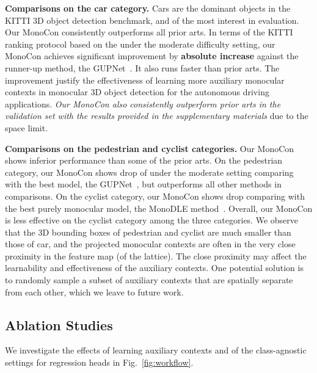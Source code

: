 \documentclass[letterpaper]{article} \usepackage{aaai22}  \usepackage{times}  \usepackage{helvet}  \usepackage{courier}  \usepackage[hyphens]{url}  \usepackage{graphicx} \urlstyle{rm} \def\UrlFont{\rm}  \usepackage{natbib}  \usepackage{caption} \DeclareCaptionStyle{ruled}{labelfont=normalfont,labelsep=colon,strut=off} \frenchspacing  \setlength{\pdfpagewidth}{8.5in}  \setlength{\pdfpageheight}{11in}  \usepackage{algorithm}
\begin{document}
\textbf{Comparisons on the car category.} Cars are the dominant objects in the KITTI 3D object detection benchmark, and of the most interest in evaluation. Our MonoCon consistently outperforms all prior arts. In terms of the KITTI ranking protocol based on the  under the moderate difficulty setting, our MonoCon achieves significant improvement by \textbf{ absolute increase} against the runner-up method, the GUPNet~\cite{gupnet}. It also runs faster than prior arts. The improvement justify the effectiveness of learning more auxiliary monocular contexts in monocular 3D object detection for the autonomous driving applications. \textit{Our MonoCon also consistently outperform prior arts in the validation set with the results provided in the supplementary materials} due to the space limit. 

\textbf{Comparisons on the pedestrian and cyclist categories.} Our MonoCon shows inferior performance than some of the prior arts. On the pedestrian category, our MonoCon shows  drop of  under the moderate setting comparing with the best model, the GUPNet~\cite{gupnet}, but outperforms all other methods in comparisons. On the cyclist category, our MonoCon shows  drop comparing with the best purely monocular model, the MonoDLE method~\cite{monodle}. Overall, our MonoCon is less effective on the cyclist category among the three categories. We observe that the 3D bounding boxes of pedestrian and cyclist are much smaller than those of car, and the projected monocular contexts are often in the very close proximity in the feature map (of the  lattice). The close proximity may affect the learnability and effectiveness of the auxiliary contexts. One potential solution is to randomly sample a subset of auxiliary contexts that are spatially separate from each other, which we leave to future work.    



\subsection{Ablation Studies}

We investigate the effects of learning auxiliary contexts and of the class-agnostic settings for regression heads in Fig.~\ref{fig:workflow}. 
\end{document}
